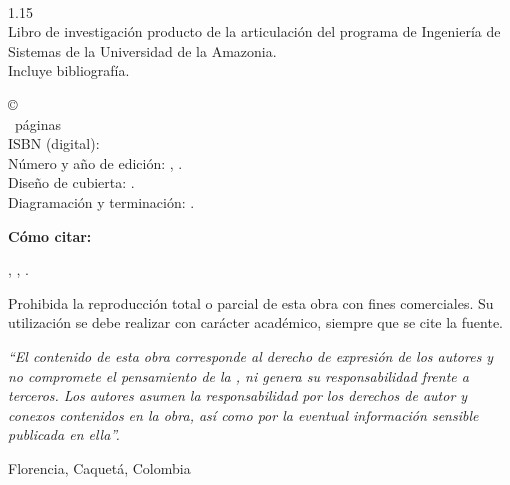 
\thispagestyle{empty}
~\vfill
\begin{spacing}{1.15}
\small
\noindent\textbf{\titulolibro}\\
\noindent Libro de investigación producto de la articulación del programa de Ingeniería de Sistemas de la Universidad de la Amazonia.\\
Incluye bibliografía.

\medskip
\noindent \copyright\ \editorial\\
\ztotpages\ páginas\\
ISBN (digital): \isbn\\
Número y año de edición: \edicion, \fechaedicion.\\
Diseño de cubierta: \disenocubierta.\\
Diagramación y terminación: \editorial.

\medskip
\noindent\textbf{Cómo citar:}\\
\hangindent=1.27cm\comocitar

\medskip
\noindent \edicion, \ciudad, \anio.

\medskip
\noindent Prohibida la reproducción total o parcial de esta obra con fines comerciales. Su utilización se debe realizar con carácter académico, siempre que se cite la fuente.

\medskip
\noindent\textit{“El contenido de esta obra corresponde al derecho de expresión de los autores y no compromete el pensamiento de la \editorial, ni genera su responsabilidad frente a terceros. Los autores asumen la responsabilidad por los derechos de autor y conexos contenidos en la obra, así como por la eventual información sensible publicada en ella”.}

\medskip
\noindent Florencia, Caquetá, Colombia
\end{spacing}
\cleardoublepage
